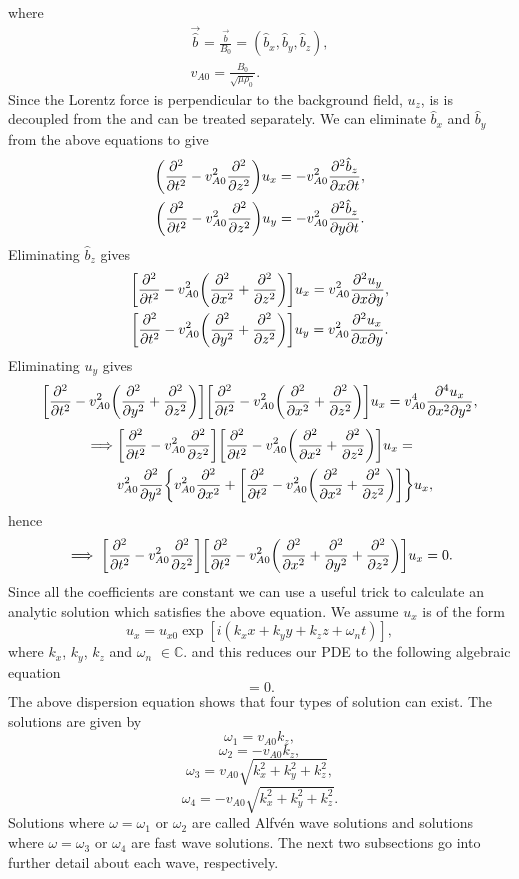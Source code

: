 where
\begin{gather}
    \label{eq:b_hat}
    \vec{\hat{b}}=\frac{\vec{b}}{B_0}=(\hat{b}_x,\hat{b}_y,\hat{b}_z),\\
    v_{A0} = \frac{B_0}{\sqrt{\mu\rho_0}}.
\end{gather}
Since the Lorentz force is perpendicular to the background field, $u_z$, is is decoupled from the and can be treated separately. We can eliminate $\hat{b}_x$ and $\hat{b}_y$ from the above equations to give
\begin{gather}
    \label{eq:ux_in_terms_of_bz}
   \qty(\pdv[2]{}{t}-v_{A0}^2\pdv[2]{}{z})u_x=-v_{A0}^2\pdv{\hat{b}_z}{x}{t}, \\
    \label{eq:uy_in_terms_of_bz}
   \qty(\pdv[2]{}{t}-v_{A0}^2\pdv[2]{}{z})u_y=-v_{A0}^2\pdv{\hat{b}_z}{y}{t}.
\end{gather}
Eliminating $\hat{b}_z$ gives
\begin{gather}
   \qty[\pdv[2]{}{t}-v_{A0}^2\qty(\pdv[2]{}{x}+\pdv[2]{}{z})]u_x=v_{A0}^2\pdv{u_y}{x}{y}, \\
    \label{eq:uy_in_terms_of_ux}
   \qty[\pdv[2]{}{t}-v_{A0}^2\qty(\pdv[2]{y}+\pdv[2]{}{z})]u_y=v_{A0}^2\pdv{u_x}{x}{y}.
\end{gather}
Eliminating $u_y$ gives
\[\qty[\pdv[2]{}{t}-v_{A0}^2\qty(\pdv[2]{y}+\pdv[2]{}{z})]\qty[\pdv[2]{}{t}-v_{A0}^2\qty(\pdv[2]{}{x}+\pdv[2]{}{z})]u_x=v_{A0}^4\frac{\partial^4 u_x}{\partial x^2 \partial y^2},\]
\[\begin{aligned}
\implies &\qty[\pdv[2]{}{t}-v_{A0}^2\pdv[2]{}{z}]\qty[\pdv[2]{}{t}-v_{A0}^2\qty(\pdv[2]{}{x}+\pdv[2]{}{z})]u_x=\\
&v_{A0}^2\pdv[2]{}{y}\qty{v_{A0}^2\pdv[2]{}{x}+\qty[\pdv[2]{}{t}-v_{A0}^2\qty(\pdv[2]{}{x}+\pdv[2]{}{z})]}u_x,
\end{aligned}\]
hence
\begin{equation}
    \implies \qty[\pdv[2]{}{t}-v_{A0}^2\pdv[2]{}{z}]\qty[\pdv[2]{}{t}-v_{A0}^2\qty(\pdv[2]{}{x}+\pdv[2]{}{y}+\pdv[2]{}{z})]u_x=0.
\end{equation}
Since all the coefficients are constant we can use a useful trick to calculate an analytic solution which satisfies the above equation. We assume $u_x$ is of the form
\[u_x = u_{x0}\exp[i(k_x x + k_y y + k_z z + \omega_n t)],\]
where $k_x$, $k_y$, $k_z$ and $\omega_n$ $\in \mathds{C}$.
and this reduces our PDE to the following algebraic equation
\begin{equation}
    [\omega_n^2 - v_{A0}^2k_z^2][\omega_n^2 - v_{A0}^2(k_x^2+k_y^2+k_z^2)] = 0.
\end{equation}
The above dispersion equation shows that four types of solution can exist. The solutions are given by
\[\omega_1 = v_{A0}k_z,\]
\[\omega_2 = -v_{A0}k_z,\]
\[\omega_3 = v_{A0}\sqrt{k_x^2 + k_y^2 + k_z^2},\]
\[\omega_4 = -v_{A0}\sqrt{k_x^2 + k_y^2 + k_z^2}.\]
Solutions where $\omega = \omega_1$ or $\omega_2$ are called Alfv\'en wave solutions and solutions where $\omega = \omega_3$ or $\omega_4$ are fast wave solutions. The next two subsections go into further detail about each wave, respectively.

